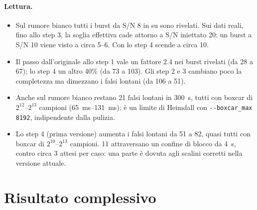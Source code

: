 \paragraph{Lettura.}
\begin{itemize}
  \item Sul rumore bianco tutti i burst da S/N 8 in su sono rivelati. Sui dati reali, fino allo step 3, la soglia
    effettiva cade attorno a S/N iniettato 20: un burst a S/N 10 viene visto a circa 5--6. Con lo step 4 scende a circa 10.
  \item Il passo dall'originale allo step 1 vale un fattore 2.4 nei burst rivelati (da 28 a 67); lo step 4 un altro 40\%
    (da 73 a 103). Gli step 2 e 3 cambiano poco la completezza ma dimezzano i falsi lontani (da 106 a 51).
  \item Anche sul rumore bianco restano 21 falsi lontani in \SI{300}{\second}, tutti con boxcar di $2^{12}$--$2^{13}$
    campioni (\SIrange{65}{131}{\milli\second}): è un limite di Heimdall con \texttt{-{}-boxcar\_max 8192}, indipendente
    dalla pulizia.
  \item Lo step 4 (prima versione) aumenta i falsi lontani da 51 a 82, quasi tutti con boxcar di $2^{10}$--$2^{13}$
    campioni. 11 attraversano un confine di blocco da \SI{4}{\second}, contro circa 3 attesi per caso: una parte è dovuta
    agli scalini corretti nella versione attuale. 
\end{itemize}

\FloatBarrier
\section{Risultato complessivo}
\label{sec:final}

